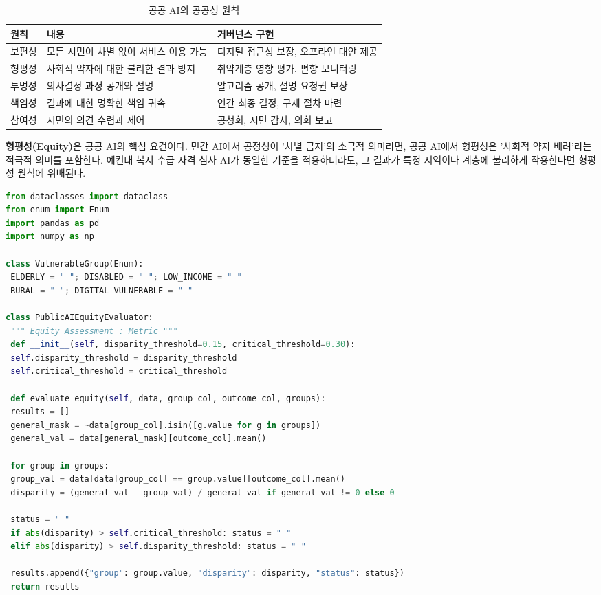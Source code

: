 \begin{table}[htbp]
\centering
\caption{공공 AI의 공공성 원칙}
\label{tab:18_1}
\begin{tabularx}{\textwidth}{p{2cm}Xp{5cm}}
\toprule
\textbf{원칙} & \textbf{내용} & \textbf{거버넌스 구현} \\
\midrule
보편성 & 모든 시민이 차별 없이 서비스 이용 가능 & 디지털 접근성 보장, 오프라인 대안 제공 \\
형평성 & 사회적 약자에 대한 불리한 결과 방지 & 취약계층 영향 평가, 편향\cite{mehrabi2021survey} 모니터링 \\
투명성 & 의사결정 과정 공개와 설명 & 알고리즘\cite{veale2019administration} 공개, 설명 요청권 보장 \\
책임성 & 결과에 대한 명확한 책임 귀속 & 인간 최종 결정, 구제 절차 마련 \\
참여성 & 시민의 의견 수렴과 제어 & 공청회, 시민 감사, 의회 보고 \\
\bottomrule
\end{tabularx}
\end{table}

\textbf{형평성(Equity)}은 공공 AI의 핵심 요건이다. 민간 AI에서 공정성이 '차별 금지'의 소극적 의미라면, 공공 AI에서 형평성은 '사회적 약자 배려'라는 적극적 의미를 포함한다. 예컨대 복지 수급 자격 심사 AI가 동일한 기준을 적용하더라도, 그 결과가 특정 지역이나 계층에 불리하게 작용한다면 형평성 원칙에 위배된다.

\begin{lstlisting}[language=Python, caption={공공 AI Equity Assessment and Vulnerable Group Impact Analysis Framework}, label={lst:equity_eval}]
from dataclasses import dataclass
from enum import Enum
import pandas as pd
import numpy as np

class VulnerableGroup(Enum):
 ELDERLY = " "; DISABLED = " "; LOW_INCOME = " "
 RURAL = " "; DIGITAL_VULNERABLE = " "

class PublicAIEquityEvaluator:
 """ Equity Assessment : Metric """
 def __init__(self, disparity_threshold=0.15, critical_threshold=0.30):
 self.disparity_threshold = disparity_threshold
 self.critical_threshold = critical_threshold

 def evaluate_equity(self, data, group_col, outcome_col, groups):
 results = []
 general_mask = ~data[group_col].isin([g.value for g in groups])
 general_val = data[general_mask][outcome_col].mean()

 for group in groups:
 group_val = data[data[group_col] == group.value][outcome_col].mean()
 disparity = (general_val - group_val) / general_val if general_val != 0 else 0

 status = " "
 if abs(disparity) > self.critical_threshold: status = " "
 elif abs(disparity) > self.disparity_threshold: status = " "

 results.append({"group": group.value, "disparity": disparity, "status": status})
 return results
\end{lstlisting}

